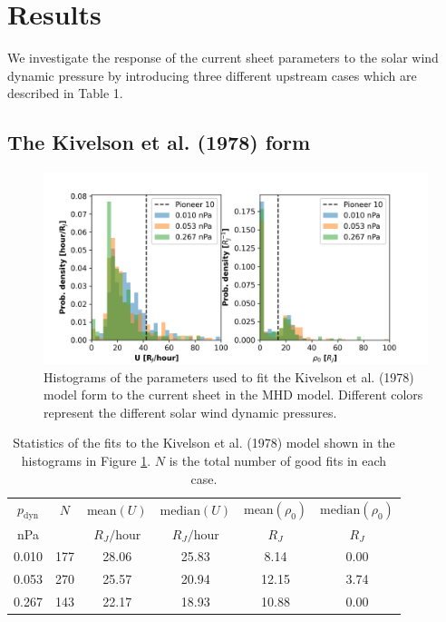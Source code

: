 \section{Results}

We investigate the response of the current sheet parameters to the solar wind dynamic pressure by introducing three different upstream cases which are described in Table 1. 

\subsection{The Kivelson et al. (1978) form}

\begin{figure}
    \centering
    \includegraphics[width=\textwidth]{images5/comparison_highdynP_kivelson.png}
    \caption{Histograms of the parameters used to fit the Kivelson et al. (1978) model form to the current sheet in the MHD model. Different colors represent the different solar wind dynamic pressures.}
    \label{fig:comparison-hist-kivelson}
\end{figure}

\begin{table}
    \centering
    \begin{tabular}{c|c|c|c|c|c}
     $p_\text{dyn}$&      $N$&     mean$(U)$ &   $\text{median}(U)$ &  mean$(\rho_0)$ &   $\text{median}(\rho_0)$\\
     nPa&  &  $R_J/$hour& $R_J/$hour& $R_J$& $R_J$\\
    \hline
     0.010 &  177 &  28.06 &  25.83 &   8.14 &     0.00 \\
     0.053 &  270 &  25.57 &  20.94 &  12.15 &     3.74\\
     0.267 &  143 &  22.17 &  18.93 &  10.88 &     0.00 \\

    \end{tabular}
    \caption{Statistics of the fits to the Kivelson et al. (1978) model shown in the histograms in Figure \protect\ref{fig:comparison-hist-kivelson}. $N$ is the total number of good fits in each case.}
    \label{tab:comparison-kivelson}
\end{table}


